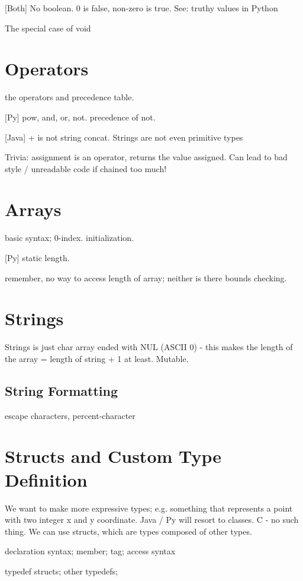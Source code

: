     [Both] No boolean. 0 is false, non-zero is true. See: truthy values in Python

    The special case of void
    
    \section{Operators}
    the operators and precedence table.

    [Py] pow, and, or, not. precedence of not.

    [Java] + is not string concat. Strings are not even primitive types

    Trivia: assignment is an operator, returns the value assigned. Can lead to bad style / unreadable code if chained too much!
    
    \section{Arrays}
    basic syntax; 0-index. initialization.

    [Py] static length.
    
    remember, no way to access length of array; neither is there bounds checking.
    
    
    \section{Strings}
    Strings is just char array ended with NUL (ASCII 0) - this makes the length of the array = length of string + 1 at least. Mutable.
        \subsection{String Formatting}
        escape characters, percent-character
    
    \section{Structs and Custom Type Definition}
    We want to make more expressive types; e.g. something that represents a point with two integer x and y coordinate. Java / Py will resort to classes. C - no such thing. We can use structs, which are types composed of other types. 

    declaration syntax; member; tag; access syntax


    typedef structs;
    other typedefs;

